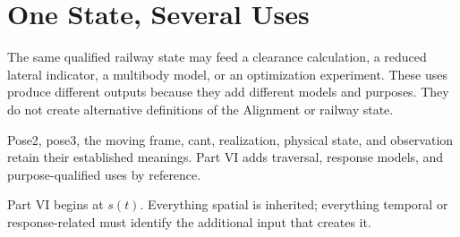\section{One State, Several Uses}

The same qualified railway state may feed a clearance calculation, a reduced
lateral indicator, a multibody model, or an optimization experiment. These
uses produce different outputs because they add different models and purposes.
They do not create alternative definitions of the Alignment or railway state.

\begin{principle}
Pose2, pose3, the moving frame, cant, realization, physical state, and
observation retain their established meanings. Part VI adds traversal,
response models, and purpose-qualified uses by reference.
\end{principle}

\begin{summary}
Part VI begins at \(s(t)\). Everything spatial is inherited; everything
temporal or response-related must identify the additional input that creates
it.
\end{summary}
